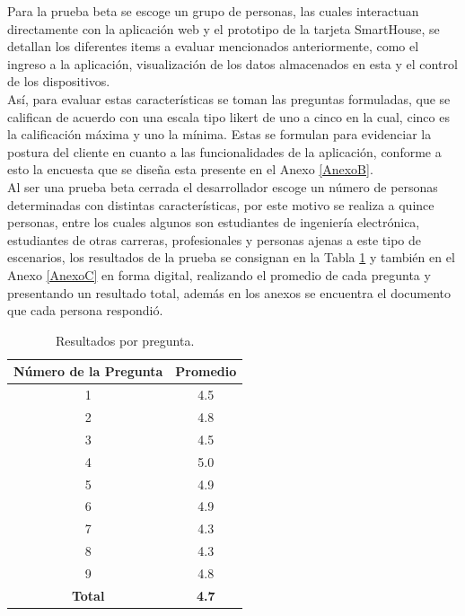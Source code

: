 Para la prueba beta se escoge un grupo de personas, las cuales interactuan directamente con la aplicación web y el prototipo de la tarjeta SmartHouse, se detallan los diferentes items a evaluar mencionados anteriormente, como el ingreso a la aplicación, visualización de los datos almacenados en esta y el control de los dispositivos.\\

Así, para evaluar estas características se toman las preguntas formuladas, que se califican de acuerdo con una escala tipo likert \cite{lik} de uno a cinco en la cual, cinco es la calificación máxima y uno la mínima. Estas se formulan para evidenciar la postura del cliente en cuanto a las funcionalidades de la aplicación, conforme a esto la encuesta que se diseña esta presente en el Anexo \ref{AnexoB}.\\

Al ser una prueba beta cerrada el desarrollador escoge un número de personas determinadas con distintas características, por este motivo se realiza a quince personas, entre los cuales algunos son estudiantes de ingeniería electrónica, estudiantes de otras carreras, profesionales y personas ajenas a este tipo de escenarios, los resultados de la prueba se consignan en la Tabla \ref{table:enc} y también en el Anexo \ref{AnexoC} en forma digital, realizando el promedio de cada pregunta y presentando un resultado total, además en los anexos se encuentra el documento que cada persona respondió.\\

\begin{table}
	\begin{center}
		\caption{Resultados por pregunta.}
		\label{table:enc}
		\begin{tabular}{|c|c|}
			\hline 
			\textbf{Número de la Pregunta} & \textbf{Promedio} \\ 
			\hline 
			1 & 4.5\\ 
			\hline 
			2 & 4.8\\ 
			\hline 
			3 & 4.5\\ 
			\hline 
			4 & 5.0\\ 
			\hline 
			5 & 4.9\\ 
			\hline 
			6 & 4.9\\ 
			\hline 
			7 & 4.3\\ 
			\hline 
			8 & 4.3\\ 
			\hline 
			9 & 4.8\\ 
			\hline 
			\textbf{Total} & \textbf{4.7}\\ 
			\hline 
		\end{tabular} 
	\end{center}
\end{table}

